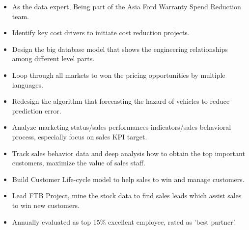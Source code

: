 \documentclass[10pt,a4paper]{altacv}
\begin{document}

\begin{fullwidth}
\makecvheader
\end{fullwidth}


\begin{itemize}
\item As the data expert, Being part of the Asia Ford Warranty Spend Reduction team.
\item Identify key cost drivers to initiate cost reduction projects.
\item Design the big database model that shows the engineering relationships among different level parts.
\item Loop through all markets to won the pricing opportunities by multiple languages.
\item Redesign the algorithm that forecasting the hazard of vehicles to reduce prediction error.
\end{itemize}

\divider

\begin{itemize}
\item Analyze marketing status/sales performances indicators/sales behavioral process, especially focus on sales KPI target.
\item Track sales behavior data and deep analysis how to obtain the top important customers, maximize the value of sales staff.
\item Build Customer Life-cycle model to help sales to win and manage customers.
\item Lead FTB Project, mine the stock data to find sales leads which assist sales to win new customers.
\item Annually evaluated as top 15\%  excellent employee, rated as 'best partner'.
\end{itemize}
\end{document}
